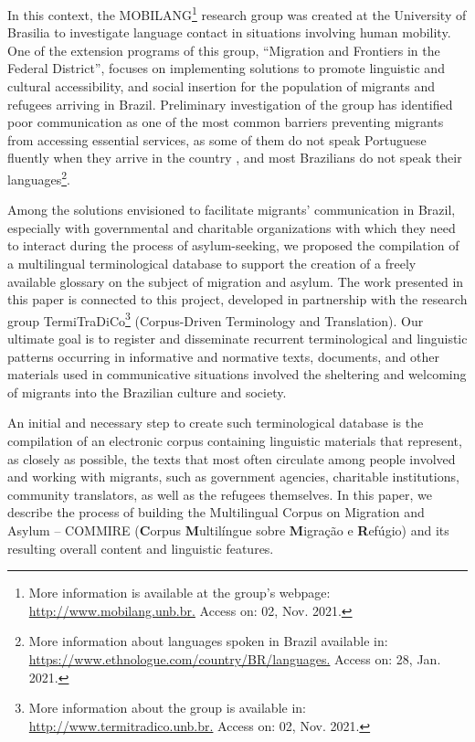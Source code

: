 \documentclass[english]{textolivre}
\begin{document}
In this context, the MOBILANG\footnote{More information is available at the group’s webpage: \url{http://www.mobilang.unb.br.} Access on: 02, Nov. 2021.}  research group was created at the University of Brasilia to investigate language contact in situations involving human mobility. One of the extension programs of this group, “Migration and Frontiers in the Federal District”, focuses on implementing solutions to promote linguistic and cultural accessibility, and social insertion for the population of migrants and refugees arriving in Brazil. Preliminary investigation of the group has identified poor communication as one of the most common barriers preventing migrants from accessing essential services, as some of them do not speak Portuguese fluently when they arrive in the country \cite{garcia_o_2019,silva_refugio_2021}, and most Brazilians do not speak their languages\footnote{More information about languages spoken in Brazil available in: \url{https://www.ethnologue.com/country/BR/languages.} Access on: 28, Jan. 2021.}.

Among the solutions envisioned to facilitate migrants’ communication in Brazil, especially with governmental and charitable organizations with which they need to interact during the process of asylum-seeking, we proposed the compilation of a multilingual terminological database to support the creation of a freely available glossary on the subject of migration and asylum. The work presented in this paper is connected to this project, developed in partnership with the research group TermiTraDiCo\footnote{More information about the group is available in:  \url{http://www.termitradico.unb.br.}  Access on: 02, Nov. 2021.} (Corpus-Driven Terminology and Translation). Our ultimate goal is to register and disseminate recurrent terminological and linguistic patterns occurring in informative and normative texts, documents, and other materials used in communicative situations involved the sheltering and welcoming of migrants into the  Brazilian culture and society.

An initial and necessary step to create such terminological database is the compilation of an electronic corpus containing linguistic materials that represent, as closely as possible, the texts that most often circulate among people involved and working with migrants, such as government agencies, charitable institutions, community translators, as well as the refugees themselves. In this paper, we describe the process of building the Multilingual Corpus on Migration and Asylum – COMMIRE (\textbf{C}orpus \textbf{M}ultilíngue sobre \textbf{M}igração e \textbf{R}efúgio) and its resulting overall content and linguistic features.
\end{document}
